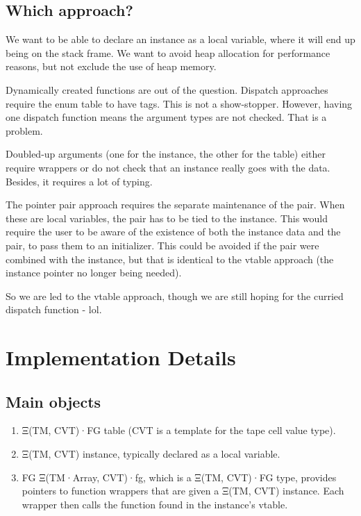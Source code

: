 \documentclass[11pt]{article}
\begin{document}
\subsection{Which approach?}
\label{sec:org6c9a58c}

We want to be able to declare an instance as a local variable, where it will end up being on the stack frame. We want to avoid heap allocation for performance reasons, but not exclude the use of heap memory.

Dynamically created functions are out of the question. Dispatch approaches require the enum table to have tags. This is not a show-stopper. However, having one dispatch function means the argument types are not checked. That is a problem.

Doubled-up arguments (one for the instance, the other for the table) either require wrappers or do not check that an instance really goes with the data. Besides, it requires a lot of typing.

The pointer pair approach requires the separate maintenance of the pair. When these are local variables, the pair has to be tied to the instance. This would require the user to be aware of the existence of both the instance data and the pair, to pass them to an initializer. This could be avoided if the pair were combined with the instance, but that
is identical to the vtable approach (the instance pointer no longer being needed).

So we are led to the vtable approach, though we are still hoping for the curried dispatch function - lol.

\section{Implementation Details}
\label{sec:org009bd61}

\subsection{Main objects}
\label{sec:org4c8ad02}

\begin{enumerate}
\item Ξ(TM, CVT)·FG table (CVT is a template for the tape cell value type).
\item Ξ(TM, CVT) instance, typically declared as a local variable.
\item FG Ξ(TM·Array, CVT)·fg, which is a Ξ(TM, CVT)·FG type, provides pointers to function
wrappers that are given a Ξ(TM, CVT) instance. Each wrapper then calls the function found in the
instance's vtable.
\end{enumerate}
\end{document}
